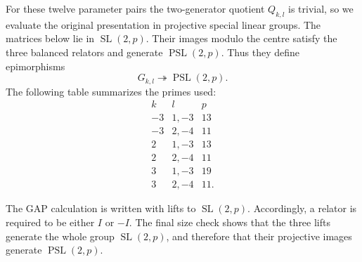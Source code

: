 \documentclass{article}
\begin{document}
For these twelve parameter pairs the two-generator quotient
$Q_{k,l}$ is trivial, so we evaluate the original presentation in projective
special linear groups.  The matrices below lie in
$\operatorname{SL}(2,p)$.  Their images modulo the centre satisfy the three
balanced relators and generate $\operatorname{PSL}(2,p)$.  Thus they define
epimorphisms
\[
 G_{k,l}\twoheadrightarrow\operatorname{PSL}(2,p).
\]
The following table summarizes the primes used:
\[
\begin{array}{c|c|c}
 k & l & p\\ \hline
 -3 & 1,-3 & 13\\
 -3 & 2,-4 & 11\\
  2 & 1,-3 & 13\\
  2 & 2,-4 & 11\\
  3 & 1,-3 & 19\\
  3 & 2,-4 & 11.
\end{array}
\]

The GAP calculation is written with lifts to $\operatorname{SL}(2,p)$.
Accordingly, a relator is required to be either $I$ or $-I$.  The final
size check shows that the three lifts generate the whole group
$\operatorname{SL}(2,p)$, and therefore that their projective images
generate $\operatorname{PSL}(2,p)$.
\end{document}
